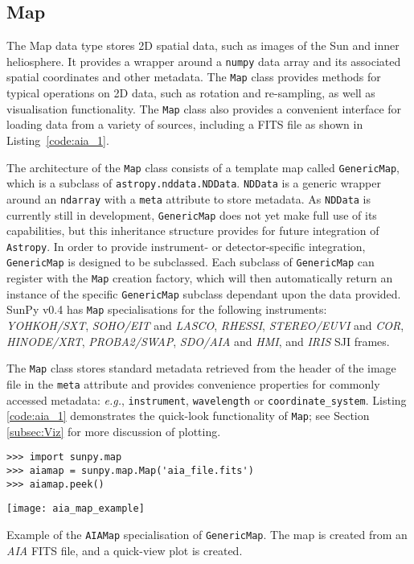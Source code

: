 \subsection{Map}\label{ssec:map}
The Map data type stores 2D spatial data, such as images of the Sun and 
inner heliosphere. It provides a wrapper around a \texttt{numpy} data array and 
its associated spatial coordinates and other metadata. The \texttt{Map} class 
provides methods for typical operations on 2D data, such as rotation and 
re-sampling, as well as visualisation functionality.
The \texttt{Map} class also provides a convenient interface for loading data 
from a variety of sources, including a FITS file as shown in 
Listing~\ref{code:aia_1}.

The architecture of the \texttt{Map} class consists of a template map called
\texttt{GenericMap}, which is a subclass of \texttt{astropy.nddata.NDData}. 
\texttt{NDData} is a generic wrapper around an \texttt{ndarray} with a 
\texttt{meta} attribute to store metadata.
As \texttt{NDData} is currently still in development, \texttt{GenericMap} does 
not yet make full use of its capabilities, but this inheritance structure 
provides for future integration of \texttt{Astropy}. In order to provide 
instrument- or detector-specific integration, \texttt{GenericMap} is designed
to be subclassed. Each subclass of \texttt{GenericMap} can register 
with the \texttt{Map} creation factory, which will then automatically return an instance
of the specific \texttt{GenericMap} subclass dependant upon the data provided. 
SunPy v0.4 has \texttt{Map} specialisations for the following instruments: 
\textit{YOHKOH/SXT}, \textit{SOHO/EIT} and \textit{LASCO}, \textit{RHESSI}, 
\textit{STEREO/EUVI} and \textit{COR}, \textit{HINODE/XRT},
\textit{PROBA2/SWAP}, \textit{SDO/AIA} and \textit{HMI}, 
and \textit{IRIS} SJI frames. 

The \texttt{Map} class stores standard metadata retrieved from the header of 
the image file in the \texttt{meta} attribute and provides convenience 
properties for commonly accessed metadata: \textit{e.g.}, \texttt{instrument}, 
\texttt{wavelength} or \texttt{coordinate\_system}. 
Listing \ref{code:aia_1} demonstrates the quick-look functionality of 
\texttt{Map}; see Section \ref{subsec:Viz} for more discussion of plotting.

\begin{listing}[H]
\begin{verbatim}
>>> import sunpy.map
>>> aiamap = sunpy.map.Map('aia_file.fits')
>>> aiamap.peek()
\end{verbatim}
\begin{center}
\texttt{[image: aia\_map\_example]}
\end{center}
\caption{Example of the \texttt{AIAMap} specialisation of 
\texttt{GenericMap}. The map is created from an \textit{AIA} FITS file,
and a quick-view plot is created.}
\label{code:aia_1}
\end{listing}


